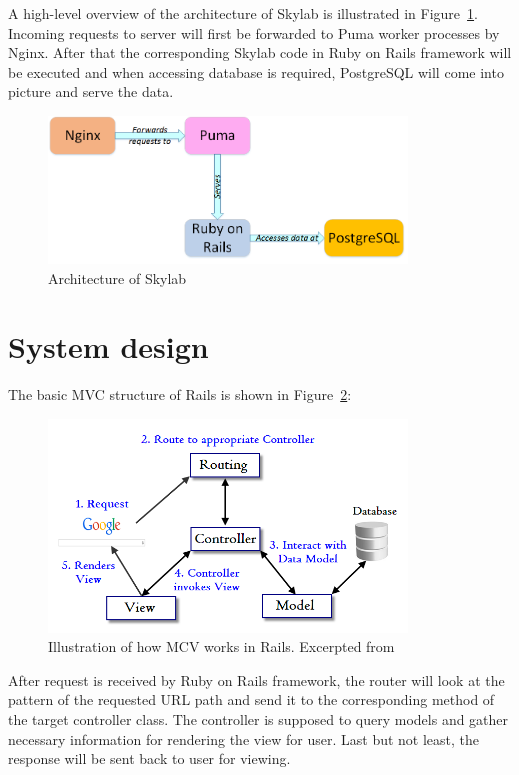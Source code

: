 A high-level overview of the architecture of Skylab is illustrated in Figure~\ref{fig:Skylabarch}. Incoming requests to server will first be forwarded to Puma worker processes by Nginx. After that the corresponding Skylab code in Ruby on Rails framework will be executed and when accessing database is required, PostgreSQL will come into picture and serve the data. 

\begin{figure}[h]
  \centering
  \includegraphics[width=0.85\textwidth]{Images/Skylab_arch.png}
  \caption{Architecture of Skylab}
  \label{fig:Skylabarch}
\end{figure}

\section{System design}

The basic MVC structure of Rails is shown in Figure~\ref{fig:RailsMVC}:

\begin{figure}[h]
  \centering
  \includegraphics[width=0.85\textwidth]{Images/Rails_MVC.png}
  \caption{Illustration of how MCV works in Rails. Excerpted from \cite{citationMVC}}
  \label{fig:RailsMVC}
\end{figure}

After request is received by Ruby on Rails framework, the router will look at the pattern of the requested URL path and send it to the corresponding method of the target controller class. The controller is supposed to query models and gather necessary information for rendering the view for user. Last but not least, the response will be sent back to user for viewing.

